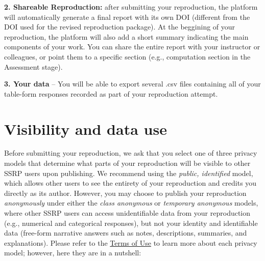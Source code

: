 \documentclass[
  openany]{book}
\begin{document}
\textbf{2. Shareable Reproduction:} after submitting your reproduction, the platform will automatically generate a final report with its own DOI (different from the DOI used for the revised reproduction package). At the beggining of your reproduction, the platform will also add a short summary indicating the main components of your work. You can share the entire report with your instructor or colleagues, or point them to a specific section (e.g., computation section in the Assessment stage).

\textbf{3. Your data} -- You will be able to export several .csv files containing all of your table-form responses recorded as part of your reproduction attempt.

\hypertarget{visibility-and-data-use}{%
\section{Visibility and data use}\label{visibility-and-data-use}}

Before submitting your reproduction, we ask that you select one of three privacy models that determine what parts of your reproduction will be visible to other SSRP users upon publishing. We recommend using the \emph{public, identified} model, which allows other users to see the entirety of your reproduction and credits you directly as its author. However, you may choose to publish your reproduction \emph{anonymously} under either the \emph{class anonymous} or \emph{temporary anonymous} models, where other SSRP users can access unidentifiable data from your reproduction (e.g., numerical and categorical responses), but not your identity and identifiable data (free-form narrative answers such as notes, descriptions, summaries, and explanations). Please refer to the \href{https://www.socialsciencereproduction.org/terms-of-use}{Terms of Use} to learn more about each privacy model; however, here they are in a nutshell:
\end{document}
